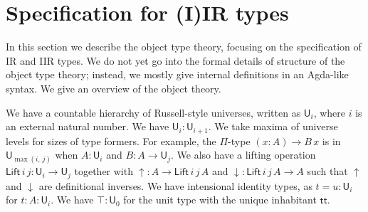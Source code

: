 \documentclass[acmsmall,screen,review,anonymous]{acmart}
\newcommand{\msf}[1]{{\mathsf{#1}}}
\newcommand{\U}{\msf{U}}
\newcommand{\Lift}{\msf{Lift}}
\newcommand{\lup}{\uparrow}
\newcommand{\ldown}{\downarrow}
\newcommand{\ttt}{\msf{tt}}
\begin{document}
\section{Specification for (I)IR types}\label{sec:specification}

In this section we describe the object type theory, focusing on the specification of IR and IIR
types. We do not yet go into the formal details of structure of the object type theory; instead, we
mostly give internal definitions in an Agda-like syntax. We give an overview of the object theory.

We have a countable hierarchy of Russell-style universes, written as $\U_i$, where $i$ is an
external natural number. We have $\U_i : \U_{i + 1}$. We take maxima of universe levels for sizes of
type formers. For example, the $\Pi$-type $(x : A) \to B\,x$ is in $\U_{\max(i,\,j)}$ when $A :
\U_i$ and $B : A \to \U_j$. We also have a lifting operation $\Lift\,i\,j : \U_i \to \U_j$ together
with $\lup : A \to \Lift\,i\,j\,A$ and $\ldown : \Lift\,i\,j\,A \to A$ such that $\lup$ and $\ldown$
are definitional inverses. We have intensional identity types, as $t = u : \U_i$ for $t : A : \U_i$.
We have $\top : \U_0$ for the unit type with the unique inhabitant $\ttt$.
\end{document}
